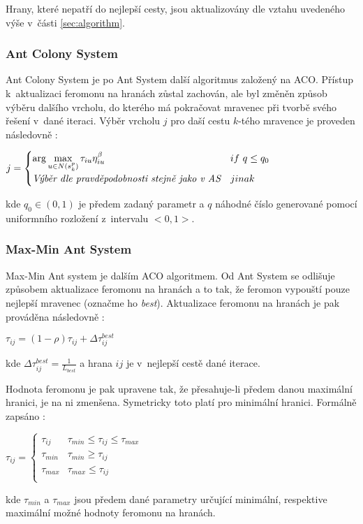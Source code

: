 \documentclass[a4paper, 12pt]{article}
\begin{document}
Hrany, které nepatří do nejlepší cesty, jsou aktualizovány dle vztahu uvedeného výše v~části \ref{sec:algorithm}.

\subsubsection{Ant Colony System}
Ant Colony System je po Ant System další algoritmus založený na ACO. Přístup k~aktualizaci feromonu na hranách zůstal zachován, ale byl změněn způsob
výběru dalšího vrcholu, do kterého má pokračovat mravenec při tvorbě svého řešení v~dané iteraci. Výběr vrcholu $j$ pro daší cestu $k$-tého mravence
je proveden následovně \cite{aco:acs}:
\begin{center}
  $j = 
  \begin{cases}
    \arg\max\limits_{u\in N(s^p_k)}\tau_{iu}\eta^{\beta}_{iu} & if\ q\leq q_0\\
    \emph{Výběr dle pravděpodobnosti stejně jako v~AS} & jinak
   \end{cases}
   $
\end{center}
kde $q_0\in (0,1)$ je předem zadaný parametr a $q$ náhodné číslo generované pomocí uniformního rozložení z~intervalu $<0,1>$.

\subsubsection{Max-Min Ant System}
Max-Min Ant system je dalším ACO algoritmem. Od Ant System se odlišuje způsobem aktualizace feromonu na hranách a to tak, že feromon vypouští pouze
nejlepší mravenec (označme ho \emph{best}). Aktualizace feromonu na hranách je pak prováděna následovně \cite{aco:maxmin}:
\begin{center}
  $\tau_{ij}=(1-\rho)\tau_{ij}+\Delta\tau_{ij}^{best}$
\end{center}
kde $\Delta\tau_{ij}^{best}=\frac{1}{L_{best}}$ a hrana $ij$ je v~nejlepší cestě dané iterace.

Hodnota feromonu je pak upravene tak, že přesahuje-li předem danou maximální hranici, je na ni zmenšena. Symetricky toto platí pro minimální hranici. Formálně
zapsáno \cite{aco:maxmin}:
\begin{center}
  $\tau_{ij} = 
  \begin{cases}
    \tau_{ij} & \tau_{min} \leq \tau_{ij} \leq \tau_{max}\\
    \tau_{min} & \tau_{min} \geq \tau_{ij}\\
    \tau_{max} & \tau_{max} \leq \tau_{ij}\\
   \end{cases}
   $
\end{center}
kde $\tau_{min}$ a $\tau_{max}$ jsou předem dané parametry určující minimální, respektive maximální možné hodnoty feromonu na hranách.
\end{document}

